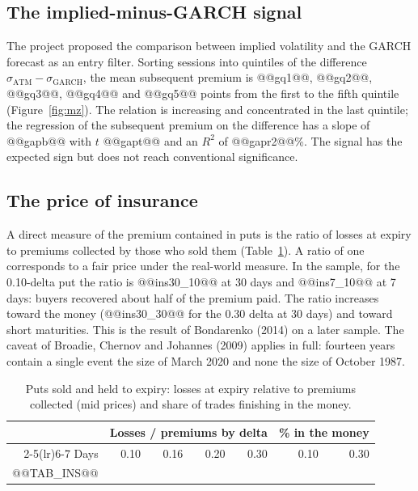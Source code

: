 \documentclass[11pt,a4paper]{article}
\begin{document}
\subsection{The implied-minus-GARCH signal}

The project proposed the comparison between implied volatility and the GARCH forecast as an entry filter. Sorting sessions into quintiles of the difference $\sigma_{\mathrm{ATM}}-\sigma_{\mathrm{GARCH}}$, the mean subsequent premium is @@gq1@@, @@gq2@@, @@gq3@@, @@gq4@@ and @@gq5@@ points from the first to the fifth quintile (Figure~\ref{fig:mz}). The relation is increasing and concentrated in the last quintile; the regression of the subsequent premium on the difference has a slope of @@gapb@@ with $t$ @@gapt@@ and an $R^2$ of @@gapr2@@\%. The signal has the expected sign but does not reach conventional significance.

\subsection{The price of insurance}

A direct measure of the premium contained in puts is the ratio of losses at expiry to premiums collected by those who sold them (Table~\ref{tab:ins}). A ratio of one corresponds to a fair price under the real-world measure. In the sample, for the 0.10-delta put the ratio is @@ins30_10@@ at 30 days and @@ins7_10@@ at 7 days: buyers recovered about half of the premium paid. The ratio increases toward the money (@@ins30_30@@ for the 0.30 delta at 30 days) and toward short maturities. This is the result of Bondarenko (2014) on a later sample. The caveat of Broadie, Chernov and Johannes (2009) applies in full: fourteen years contain a single event the size of March 2020 and none the size of October 1987.

\begin{table}[ht]\centering\small
\caption{Puts sold and held to expiry: losses at expiry relative to premiums collected (mid prices) and share of trades finishing in the money.}\label{tab:ins}
\begin{tabular}{rrrrrrr}\toprule
 & \multicolumn{4}{c}{Losses / premiums by delta} & \multicolumn{2}{c}{\% in the money} \\ \cmidrule(lr){2-5}\cmidrule(lr){6-7}
Days & 0.10 & 0.16 & 0.20 & 0.30 & 0.10 & 0.30 \\ \midrule
@@TAB_INS@@
\bottomrule\end{tabular}\end{table}
\end{document}
